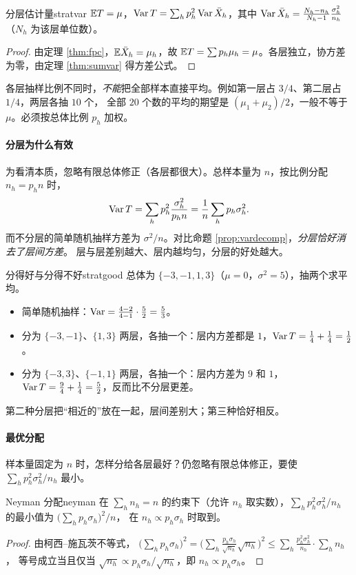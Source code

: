\begin{theorem}{分层估计量}{stratvar}
$\mathbb{E} T=\mu$，$\operatorname{Var} T=\sum_hp_h^2\operatorname{Var}\bar{X}_h$，其中 $\operatorname{Var}\bar{X}_h=\frac{N_h-n_h}{N_h-1}\frac{\sigma_h^2}{n_h}$（$N_h$ 为该层单位数）。
\end{theorem}
\begin{proof}
由定理 \ref{thm:fpc}，$\mathbb{E}\bar{X}_h=\mu_h$，故 $\mathbb{E} T=\sum p_h\mu_h=\mu$。各层独立，协方差为零，由定理 \ref{thm:sumvar} 得方差公式。
\end{proof}

\begin{warning}
各层抽样比例不同时，\emph{不能}把全部样本直接平均。例如第一层占 $3/4$、第二层占 $1/4$，两层各抽 $10$ 个，
全部 $20$ 个数的平均的期望是 $(\mu_1+\mu_2)/2$，一般不等于 $\mu$。必须按总体比例 $p_h$ 加权。
\end{warning}

\paragraph{分层为什么有效}
为看清本质，忽略有限总体修正（各层都很大）。总样本量为 $n$，按比例分配 $n_h=p_hn$ 时，
\[
\operatorname{Var} T=\sum_hp_h^2\frac{\sigma_h^2}{p_hn}=\frac1n\sum_hp_h\sigma_h^2 .
\]
而不分层的简单随机抽样方差为 $\sigma^2/n$。对比命题 \ref{prop:vardecomp}，\emph{分层恰好消去了层间方差}。
层与层差别越大、层内越均匀，分层的好处越大。

\begin{example}{分得好与分得不好}{stratgood}
总体为 $\{-3,-1,1,3\}$（$\mu=0$，$\sigma^2=5$），抽两个求平均。
\begin{itemize}
\item 简单随机抽样：$\operatorname{Var}=\frac{4-2}{4-1}\cdot\frac52=\frac53$。
\item 分为 $\{-3,-1\}$、$\{1,3\}$ 两层，各抽一个：层内方差都是 $1$，$\operatorname{Var} T=\frac14+\frac14=\frac12$。
\item 分为 $\{-3,3\}$、$\{-1,1\}$ 两层，各抽一个：层内方差为 $9$ 和 $1$，$\operatorname{Var} T=\frac94+\frac14=\frac52$，反而比不分层更差。
\end{itemize}
第二种分层把“相近的”放在一起，层间差别大；第三种恰好相反。
\end{example}

\paragraph{最优分配}
样本量固定为 $n$ 时，怎样分给各层最好？仍忽略有限总体修正，要使 $\sum_hp_h^2\sigma_h^2/n_h$ 最小。

\begin{proposition}{Neyman 分配}{neyman}
在 $\sum_hn_h=n$ 的约束下（允许 $n_h$ 取实数），$\sum_hp_h^2\sigma_h^2/n_h$ 的最小值为 $\big(\sum_hp_h\sigma_h\big)^2/n$，
在 $n_h\propto p_h\sigma_h$ 时取到。
\end{proposition}
\begin{proof}
由柯西–施瓦茨不等式，
$\big(\sum_hp_h\sigma_h\big)^2=\Big(\sum_h\frac{p_h\sigma_h}{\sqrt{n_h}}\sqrt{n_h}\Big)^2\le\sum_h\frac{p_h^2\sigma_h^2}{n_h}\cdot\sum_hn_h$，
等号成立当且仅当 $\sqrt{n_h}\propto p_h\sigma_h/\sqrt{n_h}$，即 $n_h\propto p_h\sigma_h$。
\end{proof}

